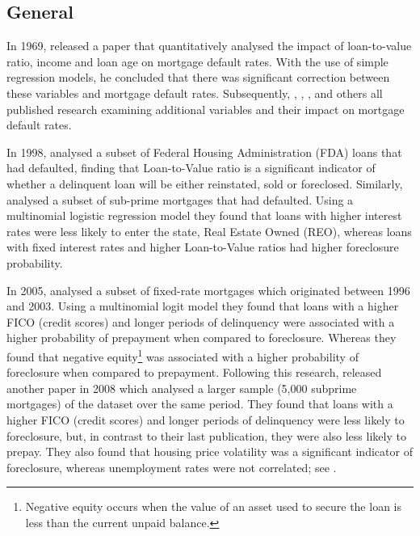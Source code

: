         \subsection{General}
        
            In 1969, \citeauthor{default_risk_1969} released a paper that quantitatively analysed the impact of loan-to-value ratio, income and loan age on mortgage default rates. With the use of simple regression models, he concluded that there was significant correction between these variables and mortgage default rates. Subsequently, , , , and others all published research examining additional variables and their impact on mortgage default rates. 
           
            In 1998, \citeauthor{foreclosure_single_family_1998} analysed a subset of Federal Housing Administration (FDA) loans that had defaulted, finding that Loan-to-Value ratio is a significant indicator of whether a delinquent loan will be either reinstated, sold or foreclosed. Similarly,  analysed a subset of sub-prime mortgages that had defaulted. Using a multinomial logistic regression model they found that loans with higher interest rates were less likely to enter the state, Real Estate Owned (REO), whereas loans with fixed interest rates and higher Loan-to-Value ratios had higher foreclosure probability. 
            
            In 2005, \citeauthor{default_risk_2005} analysed a subset of fixed-rate mortgages which originated between 1996 and 2003. Using a multinomial logit model they found that loans with a higher FICO (credit scores) and longer periods of delinquency were associated with a higher probability of prepayment when compared to foreclosure. Whereas they found that negative equity\footnote{Negative equity occurs when the value of an asset used to secure the loan is less than the current unpaid balance.} was associated with a higher probability of foreclosure when compared to prepayment. Following this research, \citeauthor{default_risk_2005} released another paper in 2008 which analysed a larger sample (5,000 subprime mortgages) of the dataset over the same period. They found that loans with a higher FICO (credit scores) and longer periods of delinquency were less likely to foreclosure, but, in contrast to their last publication, they were also less likely to prepay. They also found that housing price volatility was a significant indicator of foreclosure, whereas unemployment rates were not correlated; see \cite{default_risk_2008}.
            
